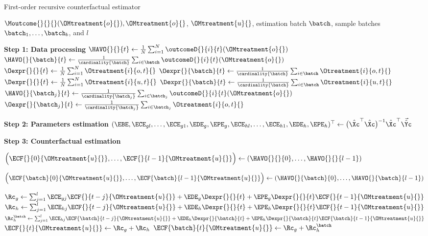 % 
\begin{algorithm}
\caption{First-order recursive counterfactual estimator}
\label{alg:FO-recursive}
% 
\begin{algorithmic}
% 
% 
\Require $\Moutcome{}{}{}(\OMtreatment{o}{}), \OMtreatment{o}{}$, $\OMtreatment{u}{}$, estimation batch $\batch$, sample batches $\batch_1, \ldots, \batch_b$, and $l$
% 

\State \hspace{-1.3em} \textbf{Step 1: Data processing}
% 
    \State $\HAVO{}{}{t}
        \gets
        \frac{1}{N} \sum_{i=1}^N \outcomeD{}{i}{t} (\OMtreatment{o}{})$
    \State $\HAVO{}{\batch}{t}
        \gets
        \frac{1}{\cardinality{\batch}} \sum_{i \in  \batch} \outcomeD{}{i}{t} (\OMtreatment{o}{})$
    \State $\Oexpr{}{}{t}
        \gets
        \frac{1}{N} \sum_{i=1}^N \Otreatment{i}{o,t}{}$
    \State $\Oexpr{}{\batch}{t}
        \gets
        \frac{1}{\cardinality{\batch}} \sum_{i \in  \batch} \Otreatment{i}{o,t}{}$
    \State $\Dexpr{}{}{t}
        \gets
        \frac{1}{N} \sum_{i=1}^N \Otreatment{i}{u,t}{}$
    \State $\Dexpr{}{\batch}{t}
        \gets
        \frac{1}{\cardinality{\batch}} \sum_{i \in  \batch} \Otreatment{i}{u,t}{}$
        \State $\HAVO{}{\batch_j}{t}
        \gets
        \frac{1}{\cardinality{\batch_j}} \sum_{i \in  \batch_j} \outcomeD{}{i}{t} (\OMtreatment{o}{})$
        \State $\Oexpr{}{\batch_j}{t}
        \gets
        \frac{1}{\cardinality{\batch_j}} \sum_{i \in  \batch_j} \Otreatment{i}{o,t}{}$
    \EndFor    
% 
\EndFor
% 

\State \hspace{-1.3em} \textbf{Step 2: Parameters estimation}
% 
\State $(\EBE, \ECE_{gl}, \ldots, \ECE_{g1}, \EDE_g, \EPE_g, \ECE_{hl}, \ldots, \ECE_{h1}, \EDE_h, \EPE_h)^\top \gets \big( \hat{\Xc}^\top \hat{\Xc} \big)^{-1} \hat{\Xc}^\top \Vec{\hat{\Yc}}$


\State \hspace{-1.3em} \textbf{Step 3: Counterfactual estimation}

\State $\Big(\ECF{}{0}{\OMtreatment{u}{}}, \ldots, \ECF{}{l-1}{\OMtreatment{u}{}} \Big) \gets \left(\HAVO{}{}{0}, \ldots, \HAVO{}{}{l-1} \right)$

\State $\Big(\ECF{\batch}{0}{\OMtreatment{u}{}}, \ldots, \ECF{\batch}{l-1}{\OMtreatment{u}{}} \Big) \gets \left(\HAVO{}{\batch}{0}, \ldots, \HAVO{}{\batch}{l-1} \right)$

% 
    \State $\Rc_g \gets \sum_{j=1}^l \ECE_{gj} \ECF{}{t-j}{\OMtreatment{u}{}} + \EDE_g \Dexpr{}{}{t} + \EPE_g \Dexpr{}{}{t} \ECF{}{t-1}{\OMtreatment{u}{}}$
    \State $\Rc_h \gets \sum_{j=1}^l \ECE_{hj} \ECF{}{t-j}{\OMtreatment{u}{}} + \EDE_h \Dexpr{}{}{t} + \EPE_h \Dexpr{}{}{t} \ECF{}{t-1}{\OMtreatment{u}{}}$
    \State $\Rc_h^\batch \gets \sum_{j=1}^l \ECE_{hj} \ECF{\batch}{t-j}{\OMtreatment{u}{}} + \EDE_h \Dexpr{}{\batch}{t} + \EPE_h \Dexpr{}{\batch}{t} \ECF{\batch}{t-1}{\OMtreatment{u}{}}$
    \State $\ECF{}{t}{\OMtreatment{u}{}} \gets \Rc_g + \Rc_h$
    \State $\ECF{\batch}{t}{\OMtreatment{u}{}} \gets \Rc_g + \Rc_h^\batch$
% 
\EndFor


\end{algorithmic}
\end{algorithm}
